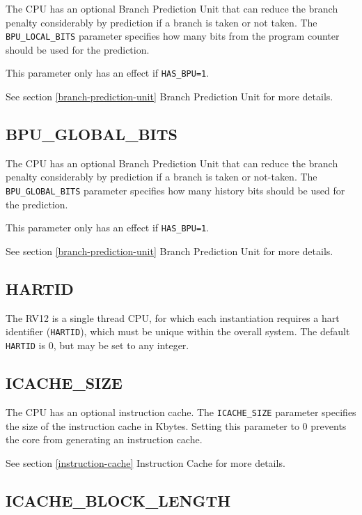 The CPU has an optional Branch Prediction Unit that can reduce the
branch penalty considerably by prediction if a branch is taken or not
taken. The \texttt{BPU\_LOCAL\_BITS} parameter specifies how many bits from the
program counter should be used for the prediction.

This parameter only has an effect if \texttt{HAS\_BPU=1}.

\protect\hypertarget{_Toc326677733}{}{\protect\hypertarget{_Toc327108319}{}{}}See
section \ref{branch-prediction-unit} Branch Prediction Unit for more details.

\subsection{BPU\_GLOBAL\_BITS}\label{bpu_global_bits}

The CPU has an optional Branch Prediction Unit that can reduce the
branch penalty considerably by prediction if a branch is taken or
not-taken. The \texttt{BPU\_GLOBAL\_BITS} parameter specifies how many history
bits should be used for the prediction.

This parameter only has an effect if \texttt{HAS\_BPU=1}.

See section \ref{branch-prediction-unit} Branch Prediction Unit for more details.

\subsection{HARTID}\label{hartid}

The RV12 is a single thread CPU, for which each instantiation requires a
hart identifier (\texttt{HARTID}), which must be unique within the overall
system. The default \texttt{HARTID} is 0, but may be set to any integer.

\subsection{ICACHE\_SIZE}\label{icache_size}

The CPU has an optional instruction cache. The \texttt{ICACHE\_SIZE} parameter
specifies the size of the instruction cache in Kbytes. Setting this
parameter to 0 prevents the core from generating an instruction cache.

See section \ref{instruction-cache} Instruction Cache for more details.

\subsection{ICACHE\_BLOCK\_LENGTH}\label{icache_block_length}

